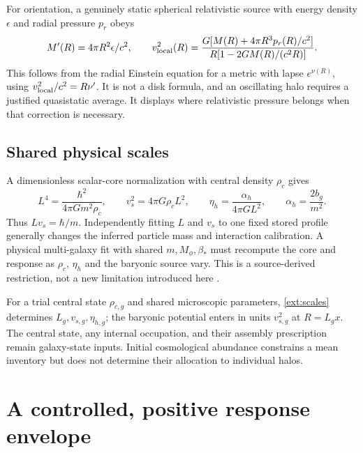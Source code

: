 \documentclass[11pt]{article}
\newcommand{\mf}{M_\phi}
\begin{document}
For orientation, a genuinely static spherical relativistic source with energy density $\epsilon$ and radial pressure $p_r$ obeys
\begin{equation}
 M'(R)=4\pi R^2\epsilon/c^2,\qquad
 v_{\rm local}^2(R)=
 \frac{G[M(R)+4\pi R^3p_r(R)/c^2]}{R[1-2GM(R)/(c^2R)]}.
\end{equation}
This follows from the radial Einstein equation for a metric with lapse $e^{\nu(R)}$, using $v_{\rm local}^2/c^2=R\nu'$. It is not a disk formula, and an oscillating halo requires a justified quasistatic average. It displays where relativistic pressure belongs when that correction is necessary.

\subsection{Shared physical scales}
A dimensionless scalar-core normalization with central density $\rho_c$ gives
\begin{equation}
 L^4=\frac{\hbar^2}{4\pi Gm^2\rho_c},\qquad
 v_s^2=4\pi G\rho_cL^2,\qquad
 \eta_h=\frac{\alpha_h}{4\pi GL^2},\qquad
 \alpha_h=\frac{2b_g}{m^2}.
 \label{ext:scales}
\end{equation}
Thus $L v_s=\hbar/m$. Independently fitting $L$ and $v_s$ to one fixed stored profile generally changes the inferred particle mass and interaction calibration. A physical multi-galaxy fit with shared $m,\mf,\beta_*$ must recompute the core and response as $\rho_c$, $\eta_h$ and the baryonic source vary. This is a source-derived restriction, not a new limitation introduced here \cite[Section S9]{cubicsupp}.

For a trial central state $\rho_{c,g}$ and shared microscopic parameters, \eqref{ext:scales} determines $L_g,v_{s,g},\eta_{h,g}$; the baryonic potential enters in units $v_{s,g}^2$ at $R=L_gx$. The central state, any internal occupation, and their assembly prescription remain galaxy-state inputs. Initial cosmological abundance constrains a mean inventory but does not determine their allocation to individual halos.

\section{A controlled, positive response envelope}
\end{document}
